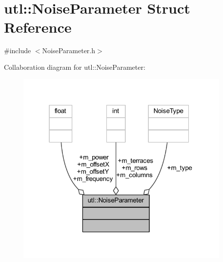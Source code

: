 \hypertarget{structutl_1_1_noise_parameter}{}\section{utl\+:\+:Noise\+Parameter Struct Reference}
\label{structutl_1_1_noise_parameter}


{\ttfamily \#include $<$Noise\+Parameter.\+h$>$}



Collaboration diagram for utl\+:\+:Noise\+Parameter\+:
\nopagebreak
\begin{figure}[H]
\begin{center}
\leavevmode
\includegraphics[width=301pt]{structutl_1_1_noise_parameter__coll__graph}
\end{center}
\end{figure}
